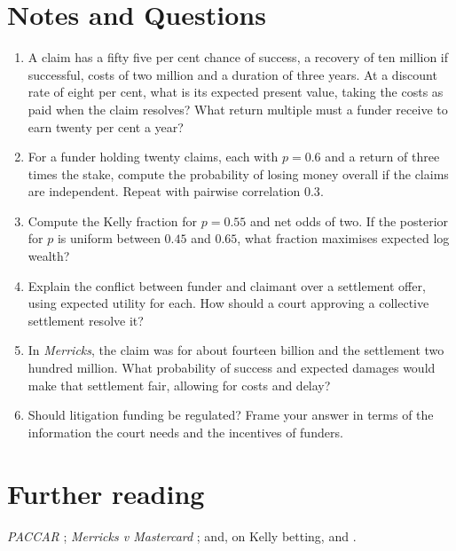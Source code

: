 \section*{Notes and Questions}
\begin{enumerate}[label=\arabic*.]
\item A claim has a fifty five per cent chance of success, a recovery of ten million if successful, costs of two million and a duration of three years. At a discount rate of eight per cent, what is its expected present value, taking the costs as paid when the claim resolves? What return multiple must a funder receive to earn twenty per cent a year?
\item For a funder holding twenty claims, each with $p = 0.6$ and a return of three times the stake, compute the probability of losing money overall if the claims are independent. Repeat with pairwise correlation $0.3$.
\item Compute the Kelly fraction for $p = 0.55$ and net odds of two. If the posterior for $p$ is uniform between $0.45$ and $0.65$, what fraction maximises expected log wealth?
\item Explain the conflict between funder and claimant over a settlement offer, using expected utility for each. How should a court approving a collective settlement resolve it?
\item In \emph{Merricks}, the claim was for about fourteen billion and the settlement two hundred million. What probability of success and expected damages would make that settlement fair, allowing for costs and delay?
\item Should litigation funding be regulated? Frame your answer in terms of the information the court needs and the incentives of funders.
\end{enumerate}

\section*{Further reading}
\emph{PACCAR} \citep{paccar2023}; \emph{Merricks v Mastercard} \citep{merricks2020}; and, on Kelly betting, \citet{kelly1956} and \citet{maclean2011}.
